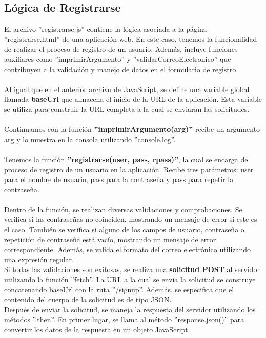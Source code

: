 \documentclass[12pt]{report}
\begin{document}
\subsection{Lógica de Registrarse}
El archivo ''registrarse.js'' contiene la lógica asociada a la página ''registrarse.html'' de una aplicación web. En este caso, tenemos la funcionalidad de realizar el proceso de registro de un usuario. Además, incluye funciones auxiliares como ''imprimirArgumento'' y ''validarCorreoElectronico'' que contribuyen a la validación y manejo de datos en el formulario de registro.
\\\\Al igual que en el anterior archivo de JavaScript, se define una variable global llamada \textbf{baseUrl} que almacena el inicio de la URL de la aplicación. Esta variable se utiliza para construir la URL completa a la cual se enviarán las solicitudes.
\\\\Continuamos con la función \textbf{''imprimirArgumento(arg)''} recibe un argumento arg y lo muestra en la consola utilizando ''console.log''.
\\\\Tenemos la función \textbf{''registrarse(user, pass, rpass)''}, la cual se encarga del proceso de registro de un usuario en la aplicación. Recibe tres parámetros: user para el nombre de usuario, pass para la contraseña y pass para repetir la contraseña.
\\\\
Dentro de la función, se realizan diversas validaciones y comprobaciones. Se verifica si las contraseñas no coinciden, mostrando un mensaje de error si este es el caso. También se verifica si alguno de los campos de usuario, contraseña o repetición de contraseña está vacío, mostrando un mensaje de error correspondiente. Además, se valida el formato del correo electrónico utilizando una expresión regular.
\\
Si todas las validaciones son exitosas, se realiza una \textbf{solicitud POST} al servidor utilizando la función ''fetch''. La URL a la cual se envía la solicitud se construye concatenando baseUrl con la ruta ''/signup''. Además, se especifica que el contenido del cuerpo de la solicitud es de tipo JSON.
\\
Después de enviar la solicitud, se maneja la respuesta del servidor utilizando los métodos ''.then''. En primer lugar, se llama al método ''response.json()'' para convertir los datos de la respuesta en un objeto JavaScript.
\\\\
\end{document}
